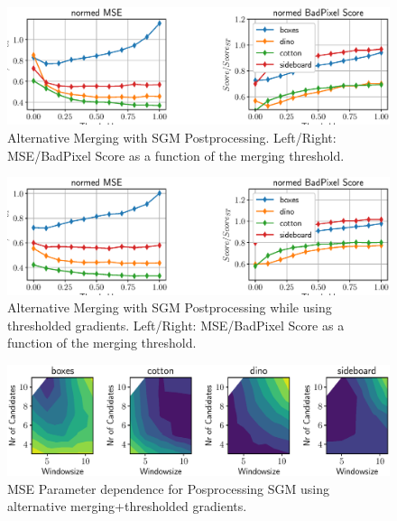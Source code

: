 \documentclass  [
  paper    = a4,
  BCOR     = 10mm,
  twoside,
  fontsize = 12pt,
  fleqn,
  toc      = bibnumbered,
  toc      = listofnumbered,
  numbers  = noendperiod,
  headings = normal,
  listof   = leveldown,
  version  = 3.03
]                                       {scrreprt}
\begin{document}
\begin{figure}
	\centering
	\includegraphics[width=1\linewidth]{images/choose_lower_sgm_ppr}
	\caption[Alternative Merging with SGM Postprocessing]{Alternative Merging with SGM Postprocessing. Left/Right: MSE/BadPixel Score as a function of the merging threshold.}
	\label{fig:chooselowersgmppr}
\end{figure}

\begin{figure}
	\centering
	\includegraphics[width=1\linewidth]{images/choose_lower_sgm_ppr_thresh}
	\caption[Alternative Merging with SGM Postprocessing with thresholded gradients]{Alternative Merging with SGM Postprocessing while using thresholded gradients. Left/Right: MSE/BadPixel Score as a function of the merging threshold.}
	\label{fig:chooselowersgmpprthresh}
\end{figure}

\begin{figure}
	\centering
	\includegraphics[width=1\linewidth]{images/choose_lower_sgm_ppr_contour_mse_100}
	\caption[Parameter dependence for Posprocessing SGM using alternative merging+thresholded gradients.]{MSE Parameter dependence for Posprocessing SGM using alternative merging+thresholded gradients.}
	\label{fig:chooselowersgmpprcontourmse100}
\end{figure}
\end{document}
